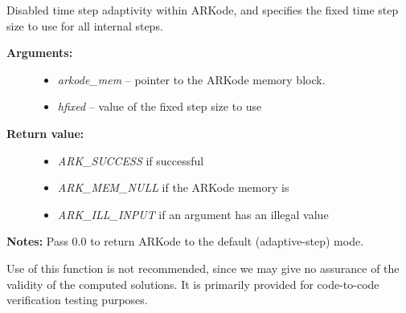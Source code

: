 \documentclass[letterpaper,10pt,english]{sphinxmanual}
\begin{document}
\begin{fulllineitems}
\label{c_interface/User_callable:ARKodeSetFixedStep}
Disabled time step adaptivity within ARKode, and specifies the
fixed time step size to use for all internal steps.
\begin{description}
\item[{\textbf{Arguments:}}] \leavevmode\begin{itemize}
\item {} 
\emph{arkode\_mem} -- pointer to the ARKode memory block.

\item {} 
\emph{hfixed} -- value of the fixed step size to use

\end{itemize}

\item[{\textbf{Return value:}}] \leavevmode\begin{itemize}
\item {} 
\emph{ARK\_SUCCESS} if successful

\item {} 
\emph{ARK\_MEM\_NULL} if the ARKode memory is 

\item {} 
\emph{ARK\_ILL\_INPUT} if an argument has an illegal value

\end{itemize}

\end{description}

\textbf{Notes:} Pass 0.0 to return ARKode to the default (adaptive-step) mode.

Use of this function is not recommended, since we may give no
assurance of the validity of the computed solutions.  It is
primarily provided for code-to-code verification testing purposes.


\end{fulllineitems}
\end{document}
